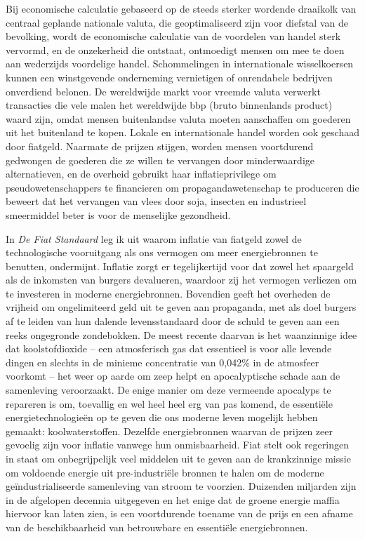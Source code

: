 \documentclass[
  a5paper,
  smalldemyvopaper,11pt,twoside,onecolumn,openright,extrafontsizes,
hidelinks]{memoir}
\begin{document}
Bij economische calculatie gebaseerd op de steeds sterker wordende
draaikolk van centraal geplande nationale valuta, die geoptimaliseerd
zijn voor diefstal van de bevolking, wordt de economische calculatie van
de voordelen van handel sterk vervormd, en de onzekerheid die ontstaat,
ontmoedigt mensen om mee te doen aan wederzijds voordelige handel.
Schommelingen in internationale wisselkoersen kunnen een winstgevende
onderneming vernietigen of onrendabele bedrijven onverdiend belonen. De
wereldwijde markt voor vreemde valuta verwerkt transacties die vele
malen het wereldwijde bbp (bruto binnenlands product) waard zijn, omdat
mensen buitenlandse valuta moeten aanschaffen om goederen uit het
buitenland te kopen. Lokale en internationale handel worden ook geschaad
door fiatgeld. Naarmate de prijzen stijgen, worden mensen voortdurend
gedwongen de goederen die ze willen te vervangen door minderwaardige
alternatieven, en de overheid gebruikt haar inflatieprivilege om
pseudowetenschappers te financieren om propagandawetenschap te
produceren die beweert dat het vervangen van vlees door soja, insecten
en industrieel smeermiddel beter is voor de menselijke gezondheid.

In \emph{De Fiat Standaard} leg ik uit waarom inflatie van fiatgeld
zowel de technologische vooruitgang als ons vermogen om meer
energiebronnen te benutten, ondermijnt. Inflatie zorgt er tegelijkertijd
voor dat zowel het spaargeld als de inkomsten van burgers devalueren,
waardoor zij het vermogen verliezen om te investeren in moderne
energiebronnen. Bovendien geeft het overheden de vrijheid om
ongelimiteerd geld uit te geven aan propaganda, met als doel burgers af
te leiden van hun dalende levensstandaard door de schuld te geven aan
een reeks ongegronde zondebokken. De meest recente daarvan is het
waanzinnige idee dat koolstofdioxide -- een atmosferisch gas dat
essentieel is voor alle levende dingen en slechts in de minieme
concentratie van 0,042\% in de atmosfeer voorkomt -- het weer op aarde
om zeep helpt en apocalyptische schade aan de samenleving veroorzaakt.
De enige manier om deze vermeende apocalyps te repareren is om,
toevallig en wel heel heel erg van pas komend, de essentiële
energietechnologieën op te geven die ons moderne leven mogelijk hebben
gemaakt: koolwaterstoffen. Dezelfde energiebronnen waarvan de prijzen
zeer gevoelig zijn voor inflatie vanwege hun onmisbaarheid. Fiat stelt
ook regeringen in staat om onbegrijpelijk veel middelen uit te geven aan
de krankzinnige missie om voldoende energie uit pre-industriële bronnen
te halen om de moderne geïndustrialiseerde samenleving van stroom te
voorzien. Duizenden miljarden zijn in de afgelopen decennia uitgegeven
en het enige dat de groene energie maffia hiervoor kan laten zien, is
een voortdurende toename van de prijs en een afname van de
beschikbaarheid van betrouwbare en essentiële energiebronnen.
\end{document}
